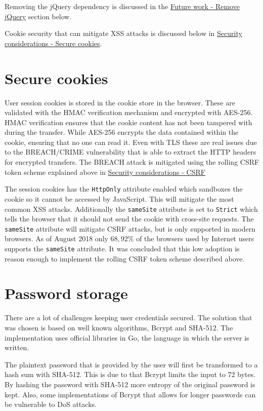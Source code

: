 \documentclass[12pt,a4paper]{report}
\begin{document}
Removing the jQuery dependency is discussed in the \hyperref[subsec:remove-jquery]{Future work - Remove jQuery} section below.

Cookie security that can mitigate XSS attacks is discussed below in \hyperref[subsec:secure-cookies]{Security considerations - Secure cookies}.

\section{Secure cookies}
\label{subsec:secure-cookies}
User session cookies is stored in the cookie store in the browser. These are validated with the HMAC verification mechanism and encrypted with AES-256. HMAC verification ensures that the cookie content has not been tampered with during the transfer\cite{fips-198}. While AES-256 encrypts the data contained within the cookie, ensuring that no one can read it\cite{fips-197}. Even with TLS these are real issues due to the BREACH/CRIME vulnerability that is able to extract the HTTP headers for encrypted transfers\cite{breach}. The BREACH attack is mitigated using the rolling CSRF token scheme explained above in \hyperref[subsec:csrf]{Security considerations - CSRF}

The session cookies has the \texttt{HttpOnly} attribute enabled which sandboxes the cookie so it cannot be accessed by JavaScript. This will mitigate the most common XSS attacks\cite{owasp-httponly}. Additionally the \texttt{sameSite} attribute is set to \texttt{Strict} which tells the browser that it should not send the cookie with cross-site requests\cite{owasp-samesite}. The \texttt{sameSite} attribute will mitigate CSRF attacks, but is only supported in modern browsers. As of August 2018 only $68,92 \%$ of the browsers used by Internet users supports the \texttt{sameSite} attribute\cite{owasp-samesite-support}. It was concluded that this low adoption is reason enough to implement the rolling CSRF token scheme described above.

\section{Password storage}
There are a lot of challenges keeping user credentials secured. The solution that was chosen is based on well known algorithms, Bcrypt and SHA-512. The implementation uses official libraries in Go, the language in which the server is written.

The plaintext password that is provided by the user will first be transformed to a hash sum with SHA-512. This is due to that Bcrypt limits the input to 72 bytes. By hashing the password with SHA-512 more entropy of the original password is kept. Also, some implementations of Bcrypt that allows for longer passwords can be vulnerable to DoS attacks\cite{bcrypt-length}.
\end{document}

